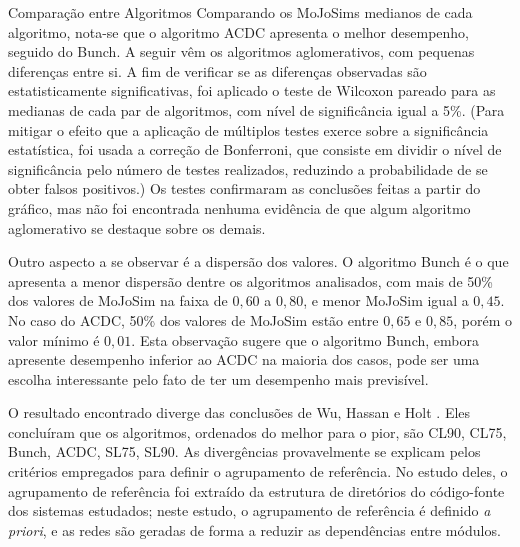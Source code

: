 \begin{section}{Comparação entre Algoritmos}
Comparando os MoJoSims medianos de cada algoritmo, nota-se que o algoritmo ACDC apresenta o melhor desempenho, seguido do Bunch. A seguir vêm os algoritmos aglomerativos, com pequenas diferenças entre si. A fim de verificar se as diferenças observadas são estatisticamente significativas, foi aplicado o teste de Wilcoxon pareado para as medianas de cada par de algoritmos, com nível de significância igual a 5\%. (Para mitigar o efeito que a aplicação de múltiplos testes exerce sobre a significância estatística, foi usada a correção de Bonferroni, que consiste em dividir o nível de significância pelo número de testes realizados, reduzindo a probabilidade de se obter falsos positivos.) Os testes confirmaram as conclusões feitas a partir do gráfico, mas não foi encontrada nenhuma evidência de que algum algoritmo aglomerativo se destaque sobre os demais.



Outro aspecto a se observar é a dispersão dos valores. O algoritmo Bunch é o que apresenta a menor dispersão dentre os algoritmos analisados, com mais de 50\% dos valores de MoJoSim na faixa de $0,60$ a $0,80$, e menor MoJoSim igual a $0,45$. No caso do ACDC, 50\% dos valores de MoJoSim estão entre $0,65$ e $0,85$, porém o valor mínimo é $0,01$. Esta observação sugere que o algoritmo Bunch, embora apresente desempenho inferior ao ACDC na maioria dos casos, pode ser uma escolha interessante pelo fato de ter um desempenho mais previsível.

O resultado encontrado diverge das conclusões de Wu, Hassan e Holt \cite{Wu2005}. Eles concluíram que os algoritmos, ordenados do melhor para o pior, são CL90, CL75, Bunch, ACDC, SL75, SL90. As divergências provavelmente se explicam pelos critérios empregados para definir o agrupamento de referência. No estudo deles, o agrupamento de referência foi extraído da estrutura de diretórios do código-fonte dos sistemas estudados; neste estudo, o agrupamento de referência é definido \emph{a priori}, e as redes são geradas de forma a reduzir as dependências entre módulos.


\end{section}
